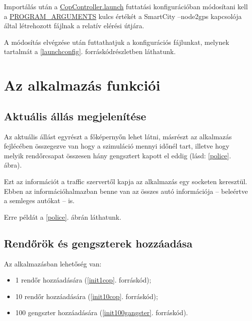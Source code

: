 \documentclass[a4paper,12pt]{report}
\begin{document}
Importálás után a \url{CopController.launch} futtatási konfigurációban módosítani kell a \url{PROGRAM_ARGUMENTS} kulcs értékét a SmartCity --node2gps kapcsolója által létrehozott fájlnak a relatív elérési útjára.

\vspace{2mm}
A módosítás elvégzése után futtathatjuk a konfigurációs fájlunkat, melynek tartalmát a \ref{launchconfig}. forráskódrészletben láthatunk.



\section{Az alkalmazás funkciói}
\label{functions}

\subsection{Aktuális állás megjelenítése}
\label{actualstate}

Az aktuális állást egyrészt a főképernyőn lehet látni, másrészt az alkalmazás fejlécében összegezve van hogy a szimuláció mennyi időnél tart, illetve hogy melyik rendőrcsapat összesen hány gengsztert kapott el eddig (lásd: \ref{police}. ábra).

\vspace{2mm}
Ezt az információt a traffic szervertől kapja az alkalmazás egy socketen keresztül. Ebben az információhalmazban benne van az összes autó információja -- beleértve a semleges autókat -- is.

\vspace{2mm}
Erre példát a \ref{police}. ábrán láthatunk.

\subsection{Rendőrök és gengszterek hozzáadása}
\label{addcops}

Az alkalmazásban lehetőség van:

\begin{itemize}
\item 1 rendőr hozzáadására (\ref{init1cop}. forráskód);
\item 10 rendőr hozzáadására (\ref{init10cop}. forráskód);
\item 100 gengszter hozzáadására (\ref{init100gangster}. forráskód).
\end{itemize}
\end{document}
